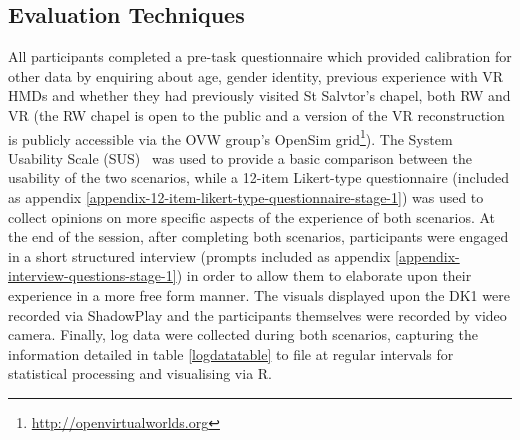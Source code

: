 
\subsection{Evaluation Techniques}

All participants completed a pre-task questionnaire which provided calibration for other data by enquiring about age, gender identity, previous experience with VR HMDs and whether they had previously visited St Salvtor's chapel, both RW and VR (the RW chapel is open to the public and a version of the VR reconstruction is publicly accessible via the OVW group's OpenSim grid\footnote{\url{http://openvirtualworlds.org}}). The System Usability Scale (SUS)~\cite{Brooke1996} was used to provide a basic comparison between the usability of the two scenarios, while a 12-item Likert-type questionnaire (included as appendix \ref{appendix-12-item-likert-type-questionnaire-stage-1}) was used to collect opinions on more specific aspects of the experience of both scenarios. At the end of the session, after completing both scenarios, participants were engaged in a short structured interview (prompts included as appendix \ref{appendix-interview-questions-stage-1}) in order to allow them to elaborate upon their experience in a more free form manner. The visuals displayed upon the DK1 were recorded via ShadowPlay and the participants themselves were recorded by video camera. Finally, log data were collected during both scenarios, capturing the information detailed in table \ref{logdatatable} to file at regular intervals for statistical processing and visualising via R.

\newpage

